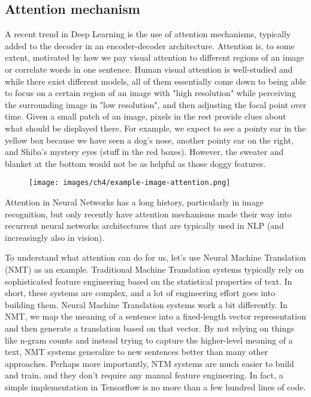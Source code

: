 \subsection{Attention mechanism}

A recent trend in Deep Learning is the use of attention mechanisms, typically added to the decoder in an encoder-decoder architecture. Attention is, to some extent, motivated by how we pay visual attention to different regions of an image or correlate words in one sentence. Human visual attention is well-studied and while there exist different models, all of them essentially come down to being able to focus on a certain region of an image with "high resolution" while perceiving the surrounding image in "low resolution", and then adjusting the focal point over time. Given a small patch of an image, pixels in the rest provide clues about what should be displayed there.
For example, we expect to see a pointy ear in the yellow box because we have seen a dog’s nose, another pointy ear on the right, and Shiba’s mystery eyes (stuff in the red boxes). However, the sweater and blanket at the bottom would not be as helpful as those doggy features.

\begin{figure}[hpt]
	\centering
	\texttt{[image: images/ch4/example-image-attention.png]}
	\caption{}
	\label{fig:example-image-attention}
\end{figure}

Attention in Neural Networks has a long history, particularly in image recognition, but only recently have attention mechanisms made their way into recurrent neural networks architectures that are typically used in NLP (and increasingly also in vision).

To understand what attention can do for us, let’s use Neural Machine Translation (NMT) as an example. Traditional Machine Translation systems typically rely on sophisticated feature engineering based on the statistical properties of text. In short, these systems are complex, and a lot of engineering effort goes into building them. Neural Machine Translation systems work a bit differently. In NMT, we map the meaning of a sentence into a fixed-length vector representation and then generate a translation based on that vector. By not relying on things like n-gram counts and instead trying to capture the higher-level meaning of a text, NMT systems generalize to new sentences better than many other approaches. Perhaps more importantly, NTM systems are much easier to build and train, and they don’t require any manual feature engineering. In fact, a simple implementation in Tensorflow is no more than a few hundred lines of code.

